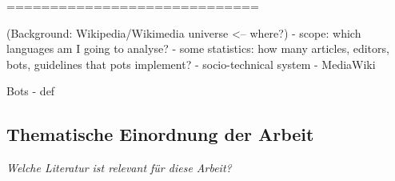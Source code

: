 \documentclass[pdftex,a4paper,11pt]{scrartcl}
\begin{document}
=============================



(Background: Wikipedia/Wikimedia universe <-- where?)
- scope: which languages am I going to analyse?
- some statistics: how many articles, editors, bots, guidelines that pots
  implement?
- socio-technical system
- MediaWiki


Bots
- def

\begin{comment}
\begin{itemize}
	\item Erläutern Sie kurz, in welchem Themenbereich Ihre Arbeit angesiedelt ist. Wo werden Sie einen Beitrag leisten?
	\item Das Ziel sollte es sein, den groben Kontext Ihrer Arbeit darzustellen.
\end{itemize}
\end{comment}

\subsection{Thematische Einordnung der Arbeit}
\noindent \emph{Welche Literatur ist relevant für diese Arbeit?}
\begin{comment}
\begin{itemize}
	\item Nutzen Sie Ihr vom Betreuer/in bereitgestellt Literatur und (!) nutzen Sie Google Scholar für Ihre weitere Recherche. Das HCC.lab forscht insbesondere in den Bereichen Computer Supported Cooperative Work and Human-Computer Interaction. Daher sind zwei Konferenzen mit den dazugehörigen Publikationen von besonderen Interesse: CHI (Annual SIGCHI Conference: Human Factors in Computing Systems) und CSCW (Computer Supported Cooperative Work). Diese Konferenzen und noch einige mehr können auf der SIGCHI Webseite gefunden werden \cite{sigchi:2015}. Die dazugehörigen Publikationen in der Digital Library von ACM \cite{acm:2015}.
	\item Bitte geben Sie die relevanten Inhalte der Artikel kurz wieder.
	\item Das Ausarbeiten von ausgewählter Literatur bzw. verwandten Arbeiten hilft Ihnen, Ihre Ziele im nachfolgenden Abschnitt klarer zu definieren. Daher ist eine Auseinandersetzung mit der Literatur von Beginn an notwendig, auch wenn es zu diesem Zeitpunkt noch nicht erschöpfend erfolgen kann.
\end{itemize}
\end{comment}
\end{document}
